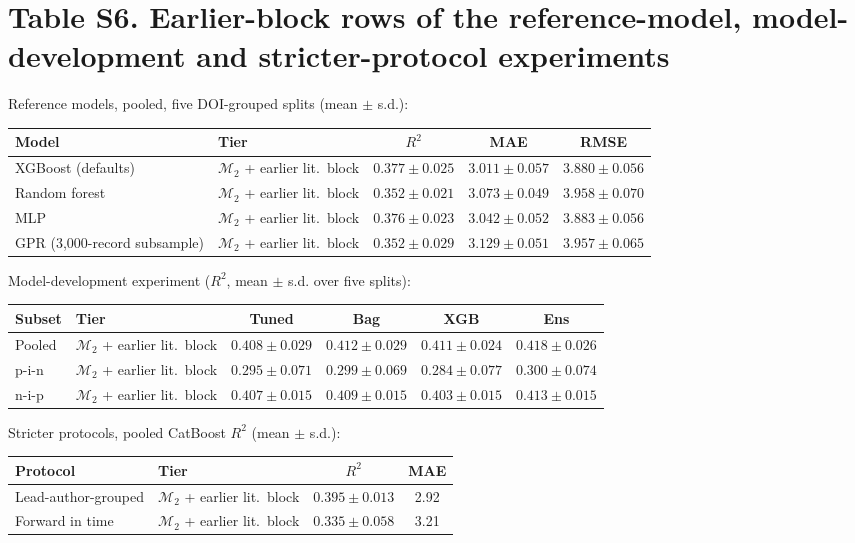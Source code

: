 \documentclass[10pt]{article}
\begin{document}
\section*{Table S6. Earlier-block rows of the reference-model, model-development and stricter-protocol experiments}
\noindent Reference models, pooled, five DOI-grouped splits (mean $\pm$ s.d.):\par\smallskip\begin{tabular}{llccc}\toprule Model & Tier & $R^2$ & MAE & RMSE\\\midrule
XGBoost (defaults) & $\mathcal{M}_2$ + earlier lit.\ block & $0.377\pm0.025$ & $3.011\pm0.057$ & $3.880\pm0.056$\\
Random forest & $\mathcal{M}_2$ + earlier lit.\ block & $0.352\pm0.021$ & $3.073\pm0.049$ & $3.958\pm0.070$\\
MLP & $\mathcal{M}_2$ + earlier lit.\ block & $0.376\pm0.023$ & $3.042\pm0.052$ & $3.883\pm0.056$\\
GPR (3,000-record subsample) & $\mathcal{M}_2$ + earlier lit.\ block & $0.352\pm0.029$ & $3.129\pm0.051$ & $3.957\pm0.065$\\
\bottomrule\end{tabular}\par\medskip
\noindent Model-development experiment ($R^2$, mean $\pm$ s.d. over five splits):\par\smallskip\begin{tabular}{llcccc}\toprule Subset & Tier & Tuned & Bag & XGB & Ens\\\midrule
Pooled & $\mathcal{M}_2$ + earlier lit.\ block & $0.408\pm0.029$ & $0.412\pm0.029$ & $0.411\pm0.024$ & $0.418\pm0.026$\\
p-i-n & $\mathcal{M}_2$ + earlier lit.\ block & $0.295\pm0.071$ & $0.299\pm0.069$ & $0.284\pm0.077$ & $0.300\pm0.074$\\
n-i-p & $\mathcal{M}_2$ + earlier lit.\ block & $0.407\pm0.015$ & $0.409\pm0.015$ & $0.403\pm0.015$ & $0.413\pm0.015$\\
\bottomrule\end{tabular}\par\medskip
\noindent Stricter protocols, pooled CatBoost $R^2$ (mean $\pm$ s.d.):\par\smallskip\begin{tabular}{llcc}\toprule Protocol & Tier & $R^2$ & MAE\\\midrule
Lead-author-grouped & $\mathcal{M}_2$ + earlier lit.\ block & $0.395\pm0.013$ & 2.92\\
Forward in time & $\mathcal{M}_2$ + earlier lit.\ block & $0.335\pm0.058$ & 3.21\\
\bottomrule\end{tabular}\par
\end{document}
